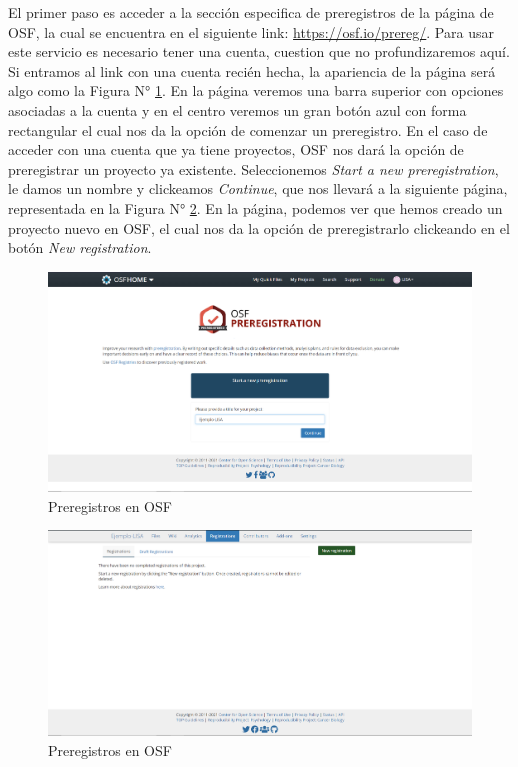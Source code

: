 \documentclass[
]{book}
\begin{document}
El primer paso es acceder a la sección especifica de preregistros de la página de OSF, la cual se encuentra en el siguiente link: \url{https://osf.io/prereg/}. Para usar este servicio es necesario tener una cuenta, cuestion que no profundizaremos aquí. Si entramos al link con una cuenta recién hecha, la apariencia de la página será algo como la Figura N° \ref{fig:osfprereg1}. En la página veremos una barra superior con opciones asociadas a la cuenta y en el centro veremos un gran botón azul con forma rectangular el cual nos da la opción de comenzar un preregistro. En el caso de acceder con una cuenta que ya tiene proyectos, OSF nos dará la opción de preregistrar un proyecto ya existente. Seleccionemos \emph{Start a new preregistration}, le damos un nombre y clickeamos \emph{Continue}, que nos llevará a la siguiente página, representada en la Figura N° \ref{fig:osfprereg2}. En la página, podemos ver que hemos creado un proyecto nuevo en OSF, el cual nos da la opción de preregistrarlo clickeando en el botón \emph{New registration}.

\begin{figure}[H]

{\centering \includegraphics[width=1\linewidth]{docs/images/osfprereg1} 

}

\caption{Preregistros en OSF}\label{fig:osfprereg1}
\end{figure}

\begin{figure}[H]

{\centering \includegraphics[width=1\linewidth]{docs/images/osfprereg2} 

}

\caption{Preregistros en OSF}\label{fig:osfprereg2}
\end{figure}
\end{document}
